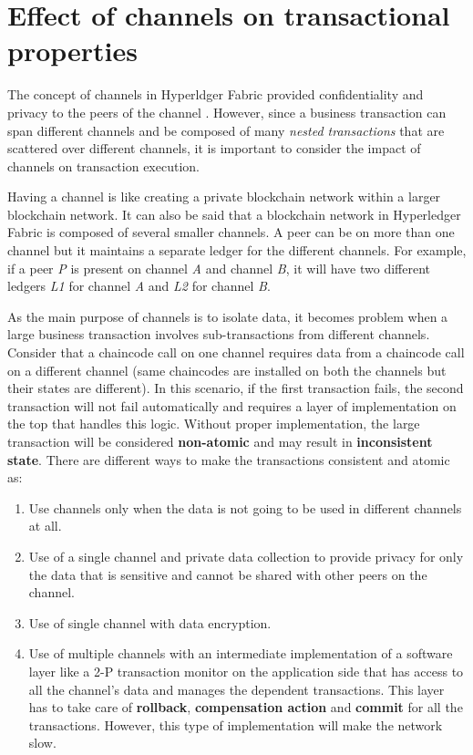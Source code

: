 \documentclass[
  a4paper,  %
  twoside,  %
  bibliography=totoc,
  headsepline,
  cleardoublepage=empty,
  parskip=half,
  draft=false
]{scrbook}
\begin{document}
\section{Effect of channels on transactional properties}
The concept of channels in Hyperldger Fabric provided confidentiality and privacy to the peers of the channel \cite{Channels}. However, since a business transaction can span different channels and be composed of many \textit{nested transactions} that are scattered over different channels, it is important to consider the impact of channels on transaction execution.

Having a channel is like creating a private blockchain network within a larger blockchain network. It can also be said that a blockchain network in Hyperledger Fabric is composed of several smaller channels. A peer can be on more than one channel but it maintains a separate ledger for the different channels. For example, if a peer \textit{P} is present on channel \textit{A} and channel \textit{B}, it will have two different ledgers \textit{L1} for channel \textit{A} and \textit{L2} for channel \textit{B}.

As the main purpose of channels is to isolate data, it becomes problem when a large business transaction involves sub-transactions from different channels. Consider that a chaincode call on one channel requires data from a chaincode call on a different channel (same chaincodes are installed on both the channels but their states are different). In this scenario, if the first transaction fails, the second transaction will not fail automatically and requires a layer of implementation on the top that handles this logic. Without proper implementation, the large transaction will be considered \textbf{non-atomic} and may result in \textbf{inconsistent state}. There are different ways to make the transactions consistent and atomic as:
\begin{enumerate}
    \item Use channels only when the data is not going to be used in different channels at all.
    \item Use of a single channel and private data collection to provide privacy for only the data that is sensitive and cannot be shared with other peers on the channel.
    \item Use of single channel with data encryption.
    \item Use of multiple channels with an intermediate implementation of a software layer like a 2-P transaction monitor on the application side that has access to all the channel's data and manages the dependent transactions. This layer has to take care of \textbf{rollback}, \textbf{compensation action} and \textbf{commit} for all the transactions. However, this type of implementation will make the network slow.
\end{enumerate}
\end{document}
